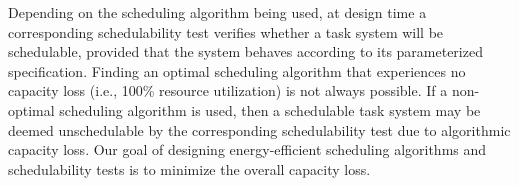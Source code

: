 
Depending on the scheduling algorithm being used, at design time a corresponding schedulability test verifies whether a task system will be schedulable, provided that the system behaves according to its parameterized specification. Finding an optimal scheduling algorithm that experiences no capacity loss (i.e., 100\% resource utilization) is not always possible. If a non-optimal scheduling algorithm is used, then a schedulable task system may be deemed unschedulable by the corresponding schedulability test due to algorithmic capacity loss.
Our goal of designing energy-efficient scheduling algorithms and schedulability tests is to minimize the overall capacity loss.%


